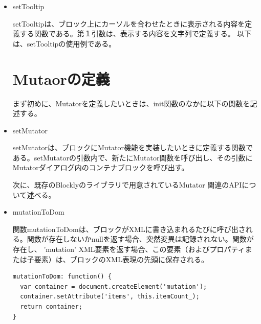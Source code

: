 \documentclass{risepaper}
\begin{document}
\begin{itemize}

\item setTooltip

setTooltipは、ブロック上にカーソルを合わせたときに表示される内容を定義する関数である。第１引数は、表示する内容を文字列で定義する。
以下は、setTooltipの使用例である。


   \section{Mutaorの定義}
   
まず初めに、Mutatorを定義したいときは、init関数のなかに以下の関数を記述する。

\item setMutator

setMutatorは、ブロックにMutator機能を実装したいときに定義する関数である。setMutatorの引数内で、新たにMutator関数を呼び出し、その引数にMutatorダイアログ内のコンテナブロックを呼び出す。


次に、既存のBlocklyのライブラリで用意されているMutator 関連のAPIについて述べる。

\item mutationToDom

関数mutationToDomは、ブロックがXMLに書き込まれるたびに呼び出される。関数が存在しないかnullを返す場合、突然変異は記録されない。関数が存在し、 'mutation' XML要素を返す場合、この要素（およびプロパティまたは子要素）は、ブロックのXML表現の先頭に保存される。

\begin{lstlisting}[basicstyle=\ttfamily\footnotesize]
mutationToDom: function() {
  var container = document.createElement('mutation');
  container.setAttribute('items', this.itemCount_);
  return container;
}
\end{lstlisting}


\end{itemize}
\end{document}
